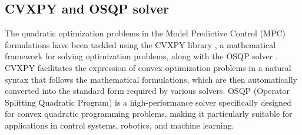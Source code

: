 \documentclass[a4paper,12pt,oneside]{book}
\begin{document}
\subsection*{CVXPY and OSQP solver}
The quadratic optimization problems in the Model Predictive Control (MPC) formulations have been tackled using the CVXPY library \cite{diamond2016cvxpy}, a mathematical framework for solving optimization problems, along with the OSQP solver \cite{Stellato_2020}.
CVXPY facilitates the expression of convex optimization problems in a natural syntax that follows the mathematical formulations, which are then automatically converted into the standard form required by various solvers.
OSQP (Operator Splitting Quadratic Program) is a high-performance solver specifically designed for convex quadratic programming problems, making it particularly suitable for applications in control systems, robotics, and machine learning.
\end{document}

